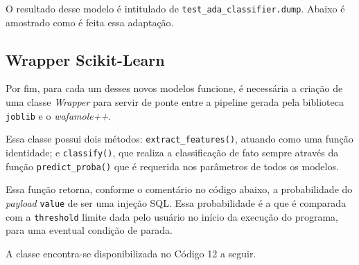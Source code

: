 O resultado desse modelo é intitulado de \verb+test_ada_classifier.dump+. Abaixo é amostrado como é feita essa adaptação.

\label{sec:codigos:modelos}
\bigskip

\subsection{Wrapper Scikit-Learn}
Por fim, para cada um desses novos modelos funcione, é necessária a criação de uma classe \textit{Wrapper} para servir de ponte entre a pipeline gerada pela biblioteca \verb+joblib+ e o \textit{wafamole++}. 

Essa classe possui dois métodos: \verb+extract_features()+, atuando como uma função identidade; e \verb+classify()+, que realiza a classificação de fato sempre através da função \verb+predict_proba()+ que é requerida nos parâmetros de todos os modelos. 

Essa função retorna, conforme o comentário no código abaixo, a probabilidade do \textit{payload} \verb+value+ de ser uma injeção SQL. Essa probabilidade é a que é comparada com a \verb+threshold+ limite dada pelo usuário no início da execução do programa, para uma eventual condição de parada. 

A classe encontra-se disponibilizada no Código 12 a seguir.

\label{sec:codigos:modelos}
\bigskip



